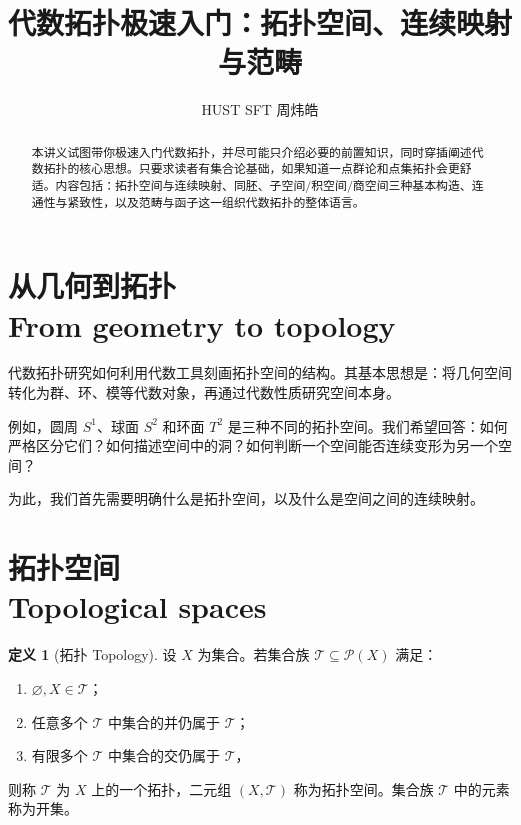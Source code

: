 \documentclass[12pt,a4paper,UTF8]{ctexart}
\title{代数拓扑极速入门：拓扑空间、连续映射与范畴}
\author{HUST SFT 周炜皓}
\date{}
\theoremstyle{definition}
\newtheorem{definition}[theorem]{定义}
\begin{document}
\maketitle

\begin{abstract}
本讲义试图带你极速入门代数拓扑，并尽可能只介绍必要的前置知识，同时穿插阐述代数拓扑的核心思想。只要求读者有集合论基础，如果知道一点群论和点集拓扑会更舒适。内容包括：拓扑空间与连续映射、同胚、子空间/积空间/商空间三种基本构造、连通性与紧致性，以及范畴与函子这一组织代数拓扑的整体语言。
\end{abstract}

\tableofcontents
\newpage

\section{从几何到拓扑\\
From geometry to topology}

代数拓扑研究如何利用代数工具刻画拓扑空间的结构。其基本思想是：将几何空间转化为群、环、模等代数对象，再通过代数性质研究空间本身。

例如，圆周 $S^1$、球面 $S^2$ 和环面 $T^2$ 是三种不同的拓扑空间。我们希望回答：如何严格区分它们？如何描述空间中的洞？如何判断一个空间能否连续变形为另一个空间？

为此，我们首先需要明确什么是拓扑空间，以及什么是空间之间的连续映射。

\section{拓扑空间\\
Topological spaces}

\begin{definition}[拓扑 Topology]
设 $X$ 为集合。若集合族 $\mathcal T\subseteq\mathcal P(X)$ 满足：
\begin{enumerate}[label=(\arabic*),itemsep=2pt]
\item $\varnothing,X\in\mathcal T$；
\item 任意多个 $\mathcal T$ 中集合的并仍属于 $\mathcal T$；
\item 有限多个 $\mathcal T$ 中集合的交仍属于 $\mathcal T$，
\end{enumerate}
则称 $\mathcal T$ 为 $X$ 上的一个拓扑，二元组 $(X,\mathcal T)$ 称为拓扑空间。集合族 $\mathcal T$ 中的元素称为开集。
\end{definition}
\end{document}
